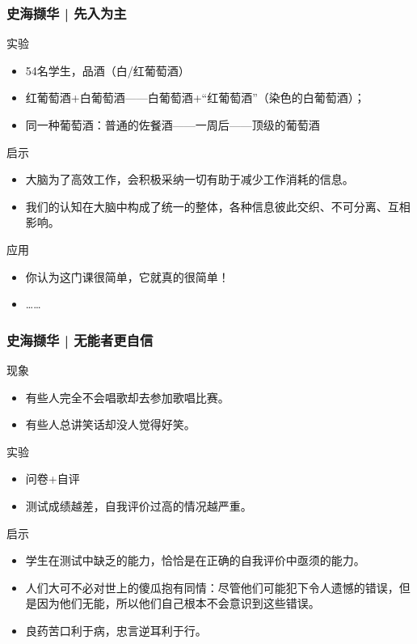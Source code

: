 \begin{frame}
  \frametitle{史海撷华 | 先入为主}
  \begin{block}{实验}
    \begin{itemize}
      \item 54名学生，品酒（白/红葡萄酒）
      \item 红葡萄酒+白葡萄酒——白葡萄酒+“红葡萄酒”（染色的白葡萄酒）；
      \item 同一种葡萄酒：普通的佐餐酒——一周后——顶级的葡萄酒
    \end{itemize}
  \end{block}
  \pause
  \begin{block}{启示}
    \begin{itemize}
      \item 大脑为了高效工作，会积极采纳一切有助于减少工作消耗的信息。
      \item 我们的认知在大脑中构成了统一的整体，各种信息彼此交织、不可分离、互相影响。
    \end{itemize}
  \end{block}
  \pause
  \begin{block}{应用}
    \begin{itemize}
      \item 你认为这门课很简单，它就真的很简单！
      \item ……
    \end{itemize}
  \end{block}
\end{frame}

\begin{frame}
  \frametitle{史海撷华 | 无能者更自信}
  \begin{block}{现象}
    \begin{itemize}
      \item 有些人完全不会唱歌却去参加歌唱比赛。
      \item 有些人总讲笑话却没人觉得好笑。
    \end{itemize}
  \end{block}
  \pause
  \begin{block}{实验}
    \begin{itemize}
      \item 问卷+自评
      \item 测试成绩越差，自我评价过高的情况越严重。
    \end{itemize}
  \end{block}
  \pause
  \begin{block}{启示}
    \begin{itemize}
      \item 学生在测试中缺乏的能力，恰恰是在正确的自我评价中亟须的能力。
      \item 人们大可不必对世上的傻瓜抱有同情：尽管他们可能犯下令人遗憾的错误，但是因为他们无能，所以他们自己根本不会意识到这些错误。
      \item 良药苦口利于病，忠言逆耳利于行。
    \end{itemize}
  \end{block}
\end{frame}


